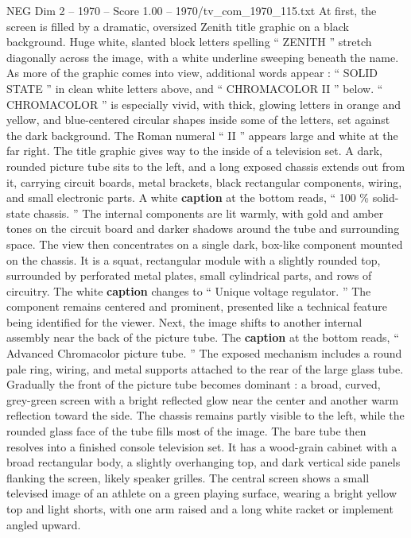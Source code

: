 \begin{textsample}{NEG Dim 2 – 1970 – Score 1.00 – 1970/tv\_com\_1970\_115.txt}  \label{ex:f2_neg_029}
At first, the screen is filled by a dramatic, oversized Zenith title graphic on a black background.
Huge white, slanted block letters spelling “ ZENITH ” stretch diagonally across the image, with a white underline sweeping beneath the name.
As more of the graphic comes into view, additional words appear : “ SOLID STATE ” in clean white letters above, and “ CHROMACOLOR II ” below. “ CHROMACOLOR ” is especially vivid, with thick, glowing letters in orange and yellow, and blue-centered circular shapes inside some of the letters, set against the dark background.
The Roman numeral “ II ” appears large and white at the far right.
The title graphic gives way to the inside of a television set.
A dark, rounded picture tube sits to the left, and a long exposed chassis extends out from it, carrying circuit boards, metal brackets, black rectangular components, wiring, and small electronic parts.
A white \textbf{caption} at the bottom reads, “ 100 \% solid-state chassis. ” The internal components are lit warmly, with gold and amber tones on the circuit board and darker shadows around the tube and surrounding space.
The view then concentrates on a single dark, box-like component mounted on the chassis.
It is a squat, rectangular module with a slightly rounded top, surrounded by perforated metal plates, small cylindrical parts, and rows of circuitry.
The white \textbf{caption} changes to “ Unique voltage regulator. ” The component remains centered and prominent, presented like a technical feature being identified for the viewer.
Next, the image shifts to another internal assembly near the back of the picture tube.
The \textbf{caption} at the bottom reads, “ Advanced Chromacolor picture tube. ” The exposed mechanism includes a round pale ring, wiring, and metal supports attached to the rear of the large glass tube.
Gradually the front of the picture tube becomes dominant : a broad, curved, grey-green screen with a bright reflected glow near the center and another warm reflection toward the side.
The chassis remains partly visible to the left, while the rounded glass face of the tube fills most of the image.
The bare tube then resolves into a finished console television set.
It has a wood-grain cabinet with a broad rectangular body, a slightly overhanging top, and dark vertical side panels flanking the screen, likely speaker grilles.
The central screen shows a small televised image of an athlete on a green playing surface, wearing a bright yellow top and light shorts, with one arm raised and a long white racket or implement angled upward.

\end{textsample}
